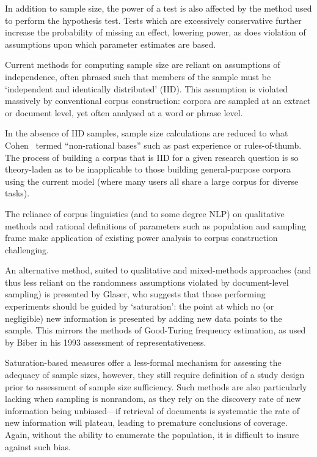 In addition to sample size, the power of a test is also affected by the method used to perform the hypothesis test.  Tests which are excessively conservative further increase the probability of missing an effect, lowering power, as does violation of assumptions upon which parameter estimates are based.

Current methods for computing sample size are reliant on assumptions of independence, often phrased such that members of the sample must be `independent and identically distributed' (IID).  This assumption is violated massively by conventional corpus construction: corpora are sampled at an extract or document level, yet often analysed at a word or phrase level.

In the absence of IID samples, sample size calculations are reduced to what Cohen~\cite[p. 145]{cohen1977statistical} termed ``non-rational bases'' such as past experience or rules-of-thumb.  The process of building a corpus that is IID for a given research question is so theory-laden as to be inapplicable to those building general-purpose corpora using the current model (where many users all share a large corpus for diverse tasks).

The reliance of corpus linguistics (and to some degree NLP) on qualitative methods and rational definitions of parameters such as population and sampling frame make application of existing power analysis to corpus construction challenging.

An alternative method, suited to qualitative and mixed-methods approaches (and thus less reliant on the randomness assumptions violated by document-level sampling) is presented by Glaser\cite{glaser1965qualitative}, who suggests that those performing experiments should be guided by `saturation': the point at which no (or negligible) new information is presented by adding new data points to the sample.  This mirrors the methods of Good-Turing frequency estimation\cite{GOOD01121953}, as used by Biber in his 1993 assessment of representativeness\cite{biber1993representativeness}.

Saturation-based measures offer a less-formal mechanism for assessing the adequacy of sample sizes, however, they still require definition of a study design prior to assessment of sample size sufficiency.  Such methods are also particularly lacking when sampling is nonrandom, as they rely on the discovery rate of new information being unbiased---if retrieval of documents is systematic the rate of new information will plateau, leading to premature conclusions of coverage.  Again, without the ability to enumerate the population, it is difficult to insure against such bias.




